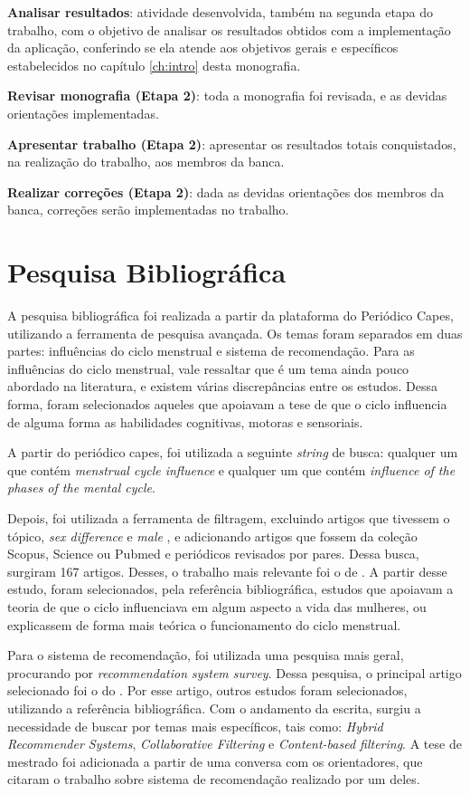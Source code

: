 \textbf{Analisar resultados}: atividade desenvolvida, também na segunda etapa do trabalho, 
com o objetivo de
analisar os resultados obtidos com a implementação da aplicação, conferindo se ela atende 
aos objetivos gerais e específicos estabelecidos no capítulo \ref{ch:intro} desta monografia.

\textbf{Revisar monografia (Etapa 2)}: toda a monografia foi revisada, e as devidas orientações implementadas.
 
\textbf{Apresentar trabalho (Etapa 2)}: apresentar os resultados totais conquistados, na 
realização do trabalho, aos membros da banca.

\textbf{Realizar correções (Etapa 2)}: dada as devidas orientações dos membros da banca, correções 
serão implementadas no trabalho.

\section{Pesquisa Bibliográfica}
\label{43}

A pesquisa bibliográfica foi realizada a partir da plataforma do Periódico Capes, utilizando a ferramenta de pesquisa avançada.
Os temas foram separados em duas partes: influências do ciclo menstrual e sistema de recomendação.
Para as influências do ciclo menstrual, vale ressaltar que é um tema ainda pouco abordado na literatura, e existem 
várias discrepâncias entre os estudos. Dessa forma, foram selecionados aqueles que apoiavam a tese de que 
o ciclo influencia de alguma forma as habilidades cognitivas, motoras e sensoriais. 

A partir do periódico capes, foi utilizada a seguinte \emph{string} de busca:
qualquer um que contém \emph{menstrual cycle influence} e qualquer um que contém 
\emph{influence of the phases of the mental cycle}. 

Depois, foi utilizada a ferramenta de filtragem, excluindo artigos que tivessem o tópico, \emph{sex difference} e \emph{male}
, e adicionando artigos que fossem da coleção Scopus, Science ou Pubmed e periódicos revisados por pares. Dessa busca, surgiram 167 artigos.
Desses, o trabalho mais relevante foi o de . A partir desse estudo, foram selecionados, pela referência bibliográfica, estudos que apoiavam 
a teoria de que o ciclo influenciava em algum aspecto a vida das mulheres, ou explicassem de forma mais teórica o funcionamento do ciclo menstrual.


Para o sistema de recomendação, foi utilizada uma pesquisa mais geral, procurando por \emph{recommendation system survey}. Dessa pesquisa, o principal artigo selecionado foi o 
do . Por esse artigo, outros estudos foram selecionados, utilizando a referência bibliográfica. Com o andamento da escrita, surgiu a necessidade de buscar
por temas mais específicos, tais como: \emph{Hybrid Recommender Systems}, \emph{Collaborative Filtering} e \emph{Content-based filtering}. A tese de mestrado \cite{mauricio} foi adicionada a partir 
de uma conversa com os orientadores, que citaram o trabalho sobre sistema de recomendação realizado por um deles.


